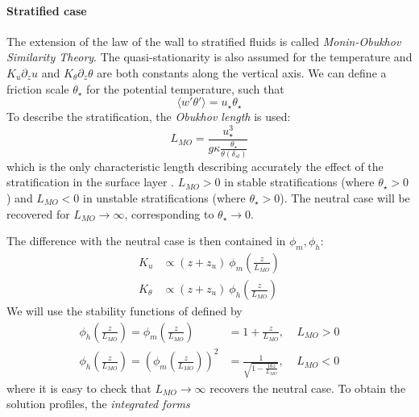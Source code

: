 \paragraph{Stratified case}
The extension of the law of the wall to stratified
fluids is called \textit{Monin-Obukhov Similarity Theory}.
The quasi-stationarity is also assumed for the temperature
and $K_u \partial_z u$ and $K_\theta \partial_z \theta$
are both constants along the vertical axis.
We can define a friction scale $\theta_\star$
for the potential temperature, such that
\begin{equation}
	\langle w' \theta' \rangle = u_\star \theta_\star
\end{equation}
To describe the stratification, the \textit{Obukhov length}
is used:
\begin{equation}
	L_{MO} = \frac{u_\star^3}{g \kappa
	\frac{\theta_\star}{\theta(\delta_{sl})}}
\end{equation}
which is the only characteristic length describing
accurately the effect of the stratification in
the surface layer \citep{obukhov_turbulence_1946}.
$L_{MO}>0$ in stable stratifications
(where $\theta_\star>0$)
and $L_{MO}<0$ in unstable stratifications
(where $\theta_\star>0$).
The neutral case will be recovered
for $L_{MO} \rightarrow \infty$, corresponding
to $\theta_\star \rightarrow 0$.
\par
The difference with the neutral case is then contained
in  $\phi_m, \phi_h$:
\begin{equation}
\begin{aligned}
	K_u &\propto (z+z_u)~ \phi_m(\frac{z}{L_{MO}}) \\
	K_\theta &\propto (z+z_u)~ \phi_h(\frac{z}{L_{MO}})
\end{aligned}
\end{equation}
We will use the stability functions of
\citep{hogstrom_non-dimensional_1988} defined by
\begin{equation}
\begin{aligned}
	\phi_h(\frac{z}{L_{MO}}) = \phi_m(\frac{z}{L_{MO}})
	&= 1+ \frac{z}{L_{MO}},
	~~~~~ L_{MO} > 0\\
	\phi_h(\frac{z}{L_{MO}}) =
	\left(\phi_m(\frac{z}{L_{MO}})\right)^2
	&= \frac{1}{\sqrt{1 - \frac{16 z}{L_{MO}}}},
	~~~~~L_{MO} < 0
\end{aligned}
\end{equation}
where it is easy to check that $L_{MO}\rightarrow \infty$
recovers the neutral case.
To obtain the solution profiles,
the \textit{integrated forms}
